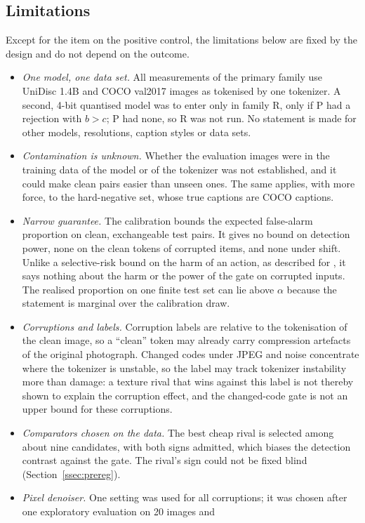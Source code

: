\subsection{Limitations}\label{ssec:limits}
Except for the item on the positive control, the limitations below are fixed by the design and do not depend on the outcome.
\begin{itemize}
\item \emph{One model, one data set.} All measurements of the primary family use UniDisc 1.4B and COCO val2017 images as tokenised
by one tokenizer. A second, 4-bit quantised model was to enter only in family R, only if P had a rejection with $b>c$; P had none, so R
was not run. No statement is made for other models, resolutions, caption styles or data sets.
\item \emph{Contamination is unknown.} Whether the evaluation images were in the training data of the model or of the tokenizer was not
established, and it could make clean pairs easier than unseen ones. The same applies, with more force, to the hard-negative set,
whose true captions are COCO captions.
\item \emph{Narrow guarantee.} The calibration bounds the expected false-alarm proportion on clean, exchangeable test pairs. It gives
no bound on detection power, none on the clean tokens of corrupted items, and none under shift. Unlike a selective-risk bound on
the harm of an action, as described for \citet{zhou2027burden}, it says nothing about the harm or the power of the gate
on corrupted inputs. The realised proportion on one finite test set can lie above $\alpha$ because the statement is marginal over the
calibration draw.
\item \emph{Corruptions and labels.} Corruption labels are relative to the tokenisation of the clean image, so a ``clean'' token
may already carry compression artefacts of the original photograph. Changed codes under JPEG and noise concentrate where the tokenizer
is unstable, so the label may track tokenizer instability more than damage: a texture rival that wins against this label is not
thereby shown to explain the corruption effect, and the changed-code gate is not an upper bound for these corruptions.
\item \emph{Comparators chosen on the data.} The best cheap rival is selected among about nine candidates, with both signs admitted, which
biases the detection contrast against the gate. The rival's sign could not be fixed blind (Section~\ref{ssec:prereg}).
\item \emph{Pixel denoiser.} One setting was used for all corruptions; it was chosen after one exploratory evaluation on 20 images and

\end{itemize}
